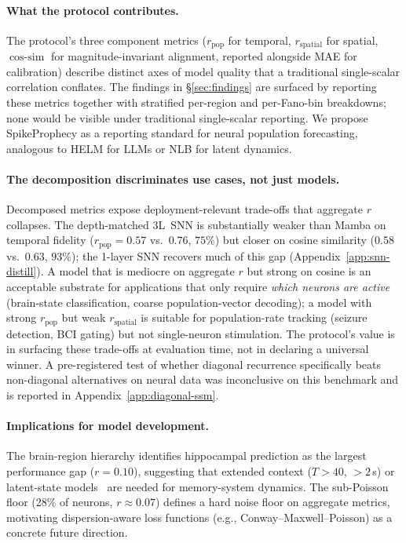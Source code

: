 \documentclass{article}
\begin{document}
\paragraph{What the protocol contributes.}
The protocol's three component metrics ($r_\mathrm{pop}$ for
temporal, $r_\mathrm{spatial}$ for spatial, $\cos\text{-sim}$ for
magnitude-invariant alignment, reported alongside MAE for
calibration) describe distinct axes of model quality that a
traditional single-scalar correlation conflates.  The findings in
\S\ref{sec:findings} are surfaced by reporting these metrics
together with stratified per-region and per-Fano-bin breakdowns;
none would be visible under traditional single-scalar reporting.
We propose SpikeProphecy as a reporting standard for neural
population forecasting, analogous to HELM for LLMs or NLB for latent
dynamics.

\paragraph{The decomposition discriminates use cases, not just models.}
Decomposed metrics expose deployment-relevant trade-offs that aggregate
$r$ collapses.  The depth-matched 3L~SNN is substantially weaker than
Mamba on temporal fidelity ($r_\mathrm{pop}{=}0.57$ vs.\ $0.76$, $75\%$)
but closer on cosine similarity ($0.58$ vs.\ $0.63$, $93\%$); the
1-layer SNN recovers much of this gap (Appendix~\ref{app:snn-distill}).
A model that is mediocre on aggregate $r$ but strong on cosine is an
acceptable substrate for applications that only require \emph{which
neurons are active} (brain-state classification, coarse
population-vector decoding); a model with strong $r_\mathrm{pop}$ but
weak $r_\mathrm{spatial}$ is suitable for population-rate tracking
(seizure detection, BCI gating) but not single-neuron stimulation.  The
protocol's value is in surfacing these trade-offs at evaluation time,
not in declaring a universal winner.  A pre-registered test of whether
diagonal recurrence specifically beats non-diagonal alternatives on
neural data was inconclusive on this benchmark and is reported in
Appendix~\ref{app:diagonal-ssm}.

\paragraph{Implications for model development.}
The brain-region hierarchy identifies hippocampal prediction as the
largest performance gap ($r = 0.10$), suggesting
that extended context ($T > 40$, $> 2$\,s) or latent-state
models~\citep{pandarinath2018lfads} are needed for memory-system
dynamics.  The sub-Poisson floor (28\% of neurons, $r \approx 0.07$)
defines a hard noise floor on aggregate metrics, motivating dispersion-aware
loss functions (e.g., Conway--Maxwell--Poisson) as a concrete future
direction.
\end{document}
